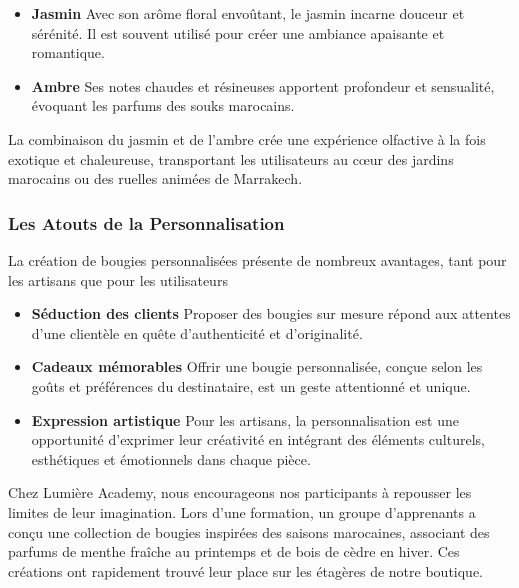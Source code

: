 \documentclass[11pt,fleqn,onecolumn,oneside]{book}
\begin{document}
\begin{itemize}
    \item \textbf{Jasmin} Avec son arôme floral envoûtant, le jasmin incarne douceur et sérénité. Il est souvent utilisé pour créer une ambiance apaisante et romantique.
    \item \textbf{Ambre} Ses notes chaudes et résineuses apportent profondeur et sensualité, évoquant les parfums des souks marocains.
\end{itemize}

\begin{remark}
La combinaison du jasmin et de l’ambre crée une expérience olfactive à la fois exotique et chaleureuse, transportant les utilisateurs au cœur des jardins marocains ou des ruelles animées de Marrakech.
\end{remark}

\subsubsection*{Les Atouts de la Personnalisation}

La création de bougies personnalisées présente de nombreux avantages, tant pour les artisans que pour les utilisateurs

\begin{itemize}
    \item \textbf{Séduction des clients} Proposer des bougies sur mesure répond aux attentes d’une clientèle en quête d’authenticité et d’originalité.
    \item \textbf{Cadeaux mémorables} Offrir une bougie personnalisée, conçue selon les goûts et préférences du destinataire, est un geste attentionné et unique.
    \item \textbf{Expression artistique} Pour les artisans, la personnalisation est une opportunité d’exprimer leur créativité en intégrant des éléments culturels, esthétiques et émotionnels dans chaque pièce.
\end{itemize}

\begin{example}
Chez Lumière Academy, nous encourageons nos participants à repousser les limites de leur imagination. Lors d’une formation, un groupe d’apprenants a conçu une collection de bougies inspirées des saisons marocaines, associant des parfums de menthe fraîche au printemps et de bois de cèdre en hiver. Ces créations ont rapidement trouvé leur place sur les étagères de notre boutique.
\end{example}
\end{document}
